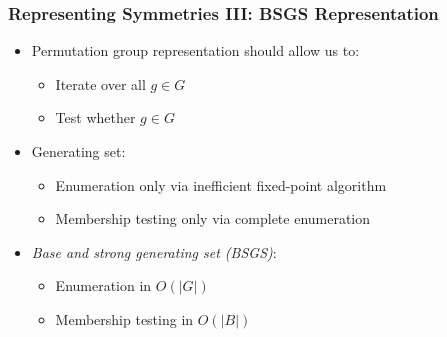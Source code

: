 \documentclass{beamer}
\begin{document}
\begin{frame}
\end{frame}

\begin{frame}
  \frametitle{Representing Symmetries III: BSGS Representation}

  \begin{itemize}
    \setlength\itemsep{.25cm}
    \item<1-> Permutation group representation should allow us to:
      \begin{itemize}
        \item<2-> Iterate over all $g \in G$
        \item<3-> Test whether $g \in G$
      \end{itemize}
    \item<4-> Generating set:
      \begin{itemize}
        \item<5-> Enumeration only via inefficient fixed-point algorithm
        \item<6-> Membership testing only via complete enumeration
      \end{itemize}
    \item<7-> \textit{Base and strong generating set (BSGS)}:
      \begin{itemize}
        \item<8-> Enumeration in $O(|G|)$
        \item<9-> Membership testing in $O(|B|)$
      \end{itemize}
  \end{itemize}
\end{frame}
\end{document}
